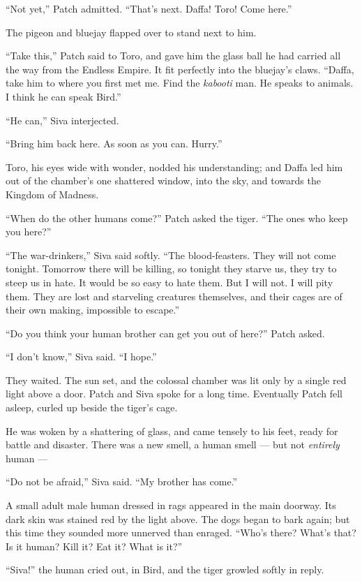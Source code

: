 \documentclass[ebook,oneside,openany,17pt]{memoir}
\begin{document}
“Not yet,” Patch admitted. “That’s next. Daffa! Toro! Come here.”

The pigeon and bluejay flapped over to stand next to him.

“Take this,” Patch said to Toro, and gave him the glass ball he had
carried all the way from the Endless Empire. It fit perfectly into the
bluejay’s claws. “Daffa, take him to where you first met me. Find the
\emph{kabooti} man. He speaks to animals. I think he can speak
Bird.”

“He can,” Siva interjected.

“Bring him back here. As soon as you can. Hurry.”

Toro, his eyes wide with wonder, nodded his understanding; and Daffa
led him out of the chamber’s one shattered window, into the sky, and
towards the Kingdom of Madness.

“When do the other humans come?” Patch asked the tiger. “The ones who
keep you here?”

“The war-drinkers,” Siva said softly. “The blood-feasters. They will
not come tonight. Tomorrow there will be killing, so tonight they
starve us, they try to steep us in hate. It would be so easy to hate
them. But I will not. I will pity them. They are lost and starveling
creatures themselves, and their cages are of their own making,
impossible to escape.”

“Do you think your human brother can get you out of here?” Patch
asked.

“I don’t know,” Siva said. “I hope.”

They waited. The sun set, and the colossal chamber was lit only by a
single red light above a door. Patch and Siva spoke for a long
time. Eventually Patch fell asleep, curled up beside the tiger’s cage.

He was woken by a shattering of glass, and came tensely to his feet,
ready for battle and disaster. There was a new smell, a human smell —
but not \emph{entirely} human —

“Do not be afraid,” Siva said. “My brother has come.”

A small adult male human dressed in rags appeared in the main
doorway. Its dark skin was stained red by the light above. The dogs
began to bark again; but this time they sounded more unnerved than
enraged. “Who’s there? What’s that? Is it human? Kill it? Eat it?
What is it?”

“Siva!” the human cried out, in Bird, and the tiger growled softly in
reply.
\end{document}
